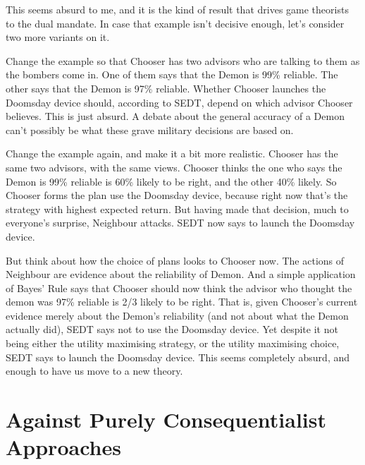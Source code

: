 \documentclass[
  12pt,
  letterpaper,
  DIV=11,
  numbers=noendperiod]{scrreprt}
\begin{document}
This seems absurd to me, and it is the kind of result that drives game
theorists to the dual mandate. In case that example isn't decisive
enough, let's consider two more variants on it.

Change the example so that Chooser has two advisors who are talking to
them as the bombers come in. One of them says that the Demon is 99\%
reliable. The other says that the Demon is 97\% reliable. Whether
Chooser launches the Doomsday device should, according to SEDT, depend
on which advisor Chooser believes. This is just absurd. A debate about
the general accuracy of a Demon can't possibly be what these grave
military decisions are based on.

Change the example again, and make it a bit more realistic. Chooser has
the same two advisors, with the same views. Chooser thinks the one who
says the Demon is 99\% reliable is 60\% likely to be right, and the
other 40\% likely. So Chooser forms the plan use the Doomsday device,
because right now that's the strategy with highest expected return. But
having made that decision, much to everyone's surprise, Neighbour
attacks. SEDT now says to launch the Doomsday device.

But think about how the choice of plans looks to Chooser now. The
actions of Neighbour are evidence about the reliability of Demon. And a
simple application of Bayes' Rule says that Chooser should now think the
advisor who thought the demon was 97\% reliable is 2/3 likely to be
right. That is, given Chooser's current evidence merely about the
Demon's reliability (and not about what the Demon actually did), SEDT
says not to use the Doomsday device. Yet despite it not being either the
utility maximising strategy, or the utility maximising choice, SEDT says
to launch the Doomsday device. This seems completely absurd, and enough
to have us move to a new theory.

\section{Against Purely Consequentialist
Approaches}\label{sec-against-pure-consequence}
\end{document}
